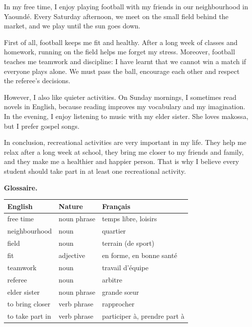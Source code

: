 \documentclass[11pt]{article}
\begin{document}
\begin{textebox}
In my free time, I enjoy playing football with my friends in our neighbourhood in Yaoundé. Every Saturday afternoon, we meet on the small field behind the market, and we play until the sun goes down.

First of all, football keeps me fit and healthy. After a long week of classes and homework, running on the field helps me forget my stress. Moreover, football teaches me teamwork and discipline: I have learnt that we cannot win a match if everyone plays alone. We must pass the ball, encourage each other and respect the referee's decisions.

However, I also like quieter activities. On Sunday mornings, I sometimes read novels in English, because reading improves my vocabulary and my imagination. In the evening, I enjoy listening to music with my elder sister. She loves makossa, but I prefer gospel songs.

In conclusion, recreational activities are very important in my life. They help me relax after a long week at school, they bring me closer to my friends and family, and they make me a healthier and happier person. That is why I believe every student should take part in at least one recreational activity.
\end{textebox}

\textbf{Glossaire.}

\begin{center}
\begin{tabularx}{\linewidth}{|l|l|X|}
\hline
\rowcolor{popblueL} \textbf{English} & \textbf{Nature} & \textbf{Français} \\
\hline
free time & noun phrase & temps libre, loisirs \\
\hline
neighbourhood & noun & quartier \\
\hline
field & noun & terrain (de sport) \\
\hline
fit & adjective & en forme, en bonne santé \\
\hline
teamwork & noun & travail d'équipe \\
\hline
referee & noun & arbitre \\
\hline
elder sister & noun phrase & grande sœur \\
\hline
to bring closer & verb phrase & rapprocher \\
\hline
to take part in & verb phrase & participer à, prendre part à \\
\hline
\end{tabularx}
\end{center}
\end{document}
